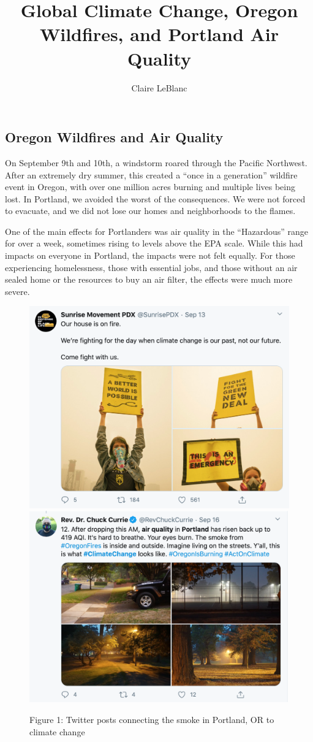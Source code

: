 \documentclass[]{article}
\title{Global Climate Change, Oregon Wildfires, and Portland Air Quality}
\author{Claire LeBlanc}
\date{}
\begin{document}
\maketitle

\hypertarget{oregon-wildfires-and-air-quality}{%
\subsection{Oregon Wildfires and Air
Quality}\label{oregon-wildfires-and-air-quality}}

On September 9th and 10th, a windstorm roared through the Pacific
Northwest. After an extremely dry summer, this created a ``once in a
generation'' wildfire event in Oregon, with over one million acres
burning and multiple lives being lost. In Portland, we avoided the worst
of the consequences. We were not forced to evacuate, and we did not lose
our homes and neighborhoods to the flames.

One of the main effects for Portlanders was air quality in the
``Hazardous'' range for over a week, sometimes rising to levels above
the EPA scale. While this had impacts on everyone in Portland, the
impacts were not felt equally. For those experiencing homelessness,
those with essential jobs, and those without an air sealed home or the
resources to buy an air filter, the effects were much more severe.

\begin{figure}
\includegraphics[width=0.5\linewidth]{Screen Shot 2020-09-21 at 8.55.15 PM} \includegraphics[width=0.5\linewidth]{Screen Shot 2020-09-21 at 9.03.22 PM} \caption{Figure 1: Twitter posts connecting the smoke in Portland, OR to climate change}\label{fig:unnamed-chunk-1}
\end{figure}
\end{document}
